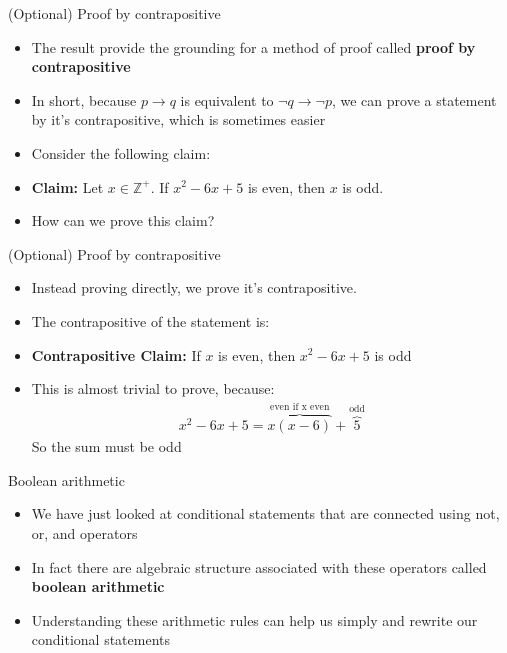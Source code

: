 \documentclass[10pt,xcolor={table,dvipsnames},t]{beamer}
\begin{document}
\begin{frame}{(Optional) Proof by contrapositive}
  \begin{itemize}
    \item The result provide the grounding for a method of proof called \textbf{proof by contrapositive}
    \item In short, because $p \rightarrow q$ is equivalent to $\neg q \rightarrow \neg p$, we can prove a statement by it's contrapositive, which is sometimes easier
    \item Consider the following claim:
    \item \textbf{Claim:}
      Let $x\in\mathbb{Z}^+$. If $x^2 -6x + 5$ is even, then $x$ is odd.
    \item How can we prove this claim?
  \end{itemize}
\end{frame}
\begin{frame}{(Optional) Proof by contrapositive}
  \begin{itemize}
    \item Instead proving directly, we prove it's contrapositive. 
    \item The contrapositive of the statement is:
    \item \textbf{Contrapositive Claim:} If $x$ is even, then $x^2 - 6x + 5$ is odd
    \item This is almost trivial to prove, because:
    \begin{align*}
      x^2 - 6x + 5 = \overbrace{x(x-6)}^{\text{even if x even}} + \overbrace{5}^{\text{odd}}
    \end{align*}
    So the sum must be odd
  \end{itemize}
\end{frame}


\begin{frame}{Boolean arithmetic}
  \begin{itemize}
    \item We have just looked at conditional statements that are connected using not, or, and operators
    \item In fact there are algebraic structure associated with these operators called \textbf{boolean arithmetic}
    \item Understanding these arithmetic rules can help us simply and rewrite our conditional statements
  \end{itemize}
\end{frame}
\end{document}
